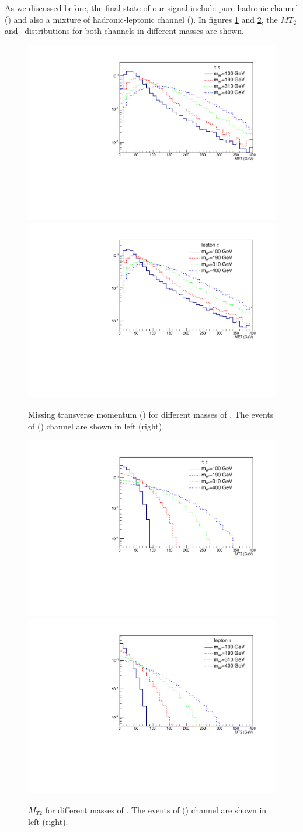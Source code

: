 As we discussed before, the final state of our signal include pure hadronic channel (\tauTau) and also a mixture of hadronic-leptonic channel (\lepTau ).  In figures \ref{fig:met} and \ref{fig:mt2}, the $MT_2$ and \MET  ~distributions for both channels in different \wprime masses are shown.
\begin{figure}[htb]
  \centering
  \includegraphics*[width=.45\textwidth]{figs/MET_hh.pdf}
  \hspace{3mm}
  \includegraphics*[width=.45\textwidth]{figs/MET_lh.pdf}
  \caption{Missing transverse momentum (\MET) for different masses of \wprime. The events of \tauTau(\lepTau) channel are shown in left (right).}
  \label{fig:met}
\end{figure}
\begin{figure}[htb]
  \centering
  \includegraphics*[width=.45\textwidth]{figs/MT2_hh.pdf}
  \hspace{3mm}
  \includegraphics*[width=.45\textwidth]{figs/MT2_lh.pdf}
  \caption{$M_{T2}$ for different masses of \wprime. The events of \tauTau (\lepTau) channel are shown in left (right).}
  \label{fig:mt2}
\end{figure} 
